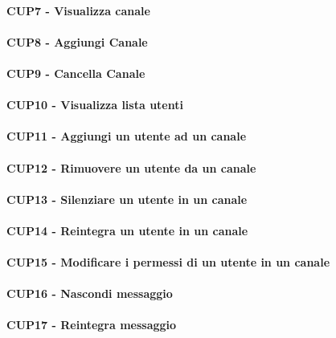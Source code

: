 \paragraph{CUP7 - Visualizza canale\\}
\paragraph{CUP8 - Aggiungi Canale\\}
\paragraph{CUP9 - Cancella Canale\\}
\paragraph{CUP10 - Visualizza lista utenti\\}
\paragraph{CUP11 - Aggiungi un utente ad un canale\\}
\paragraph{CUP12 - Rimuovere un utente da un canale \\}
\paragraph{CUP13 - Silenziare un utente in un canale\\}
\paragraph{CUP14 - Reintegra un utente in un canale\\}
\paragraph{CUP15 - Modificare i permessi di un utente in un canale \\}
\paragraph{CUP16 - Nascondi messaggio\\}
\paragraph{CUP17 - Reintegra messaggio\\}

